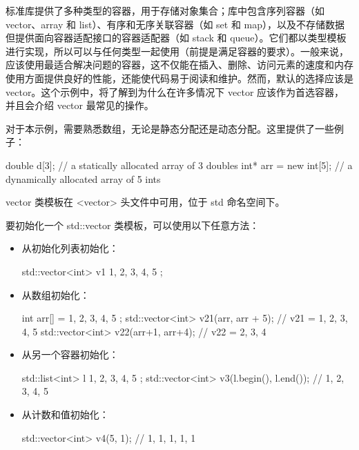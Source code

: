 标准库提供了多种类型的容器，用于存储对象集合；库中包含序列容器（如 vector、array 和 list）、有序和无序关联容器（如 set 和 map），以及不存储数据但提供面向容器适配接口的容器适配器（如 stack 和 queue）。它们都以类型模板进行实现，所以可以与任何类型一起使用（前提是满足容器的要求）。一般来说，应该使用最适合解决问题的容器，这不仅能在插入、删除、访问元素的速度和内存使用方面提供良好的性能，还能使代码易于阅读和维护。然而，默认的选择应该是 vector。这个示例中，将了解到为什么在许多情况下 vector 应该作为首选容器，并且会介绍 vector 最常见的操作。


对于本示例，需要熟悉数组，无论是静态分配还是动态分配。这里提供了一些例子：

\begin{cpp}
double d[3];           // a statically allocated array of 3 doubles
int* arr = new int[5]; // a dynamically allocated array of 5 ints
\end{cpp}

vector 类模板在 <vector> 头文件中可用，位于 std 命名空间下。


要初始化一个 std::vector 类模板，可以使用以下任意方法：

\begin{itemize}
\item
从初始化列表初始化：

\begin{cpp}
std::vector<int> v1 { 1, 2, 3, 4, 5 };
\end{cpp}

\item
从数组初始化：

\begin{cpp}
int arr[] = { 1, 2, 3, 4, 5 };
std::vector<int> v21(arr, arr + 5); // v21 = { 1, 2, 3, 4, 5 }
std::vector<int> v22(arr+1, arr+4); // v22 = { 2, 3, 4 }
\end{cpp}

\item
从另一个容器初始化：

\begin{cpp}
std::list<int> l{ 1, 2, 3, 4, 5 };
std::vector<int> v3(l.begin(), l.end()); //{ 1, 2, 3, 4, 5 }
\end{cpp}

\item
从计数和值初始化：

\begin{cpp}
std::vector<int> v4(5, 1); // {1, 1, 1, 1, 1}
\end{cpp}

\end{itemize}


